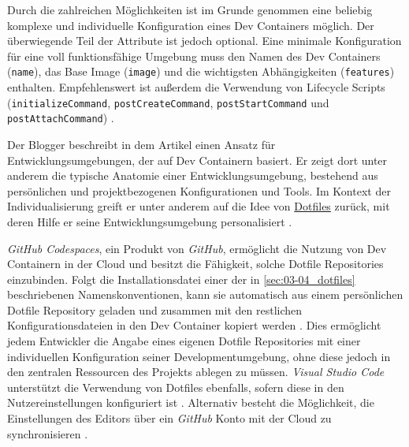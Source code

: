 Durch die zahlreichen Möglichkeiten ist im Grunde genommen eine beliebig komplexe und individuelle Konfiguration eines Dev Containers möglich. Der überwiegende Teil der Attribute ist jedoch optional. Eine minimale Konfiguration für eine voll funktionsfähige Umgebung muss den Namen des Dev Containers (\texttt{name}), das Base Image (\texttt{image}) und die wichtigsten Abhängigkeiten (\texttt{features}) enthalten. Empfehlenswert ist außerdem die Verwendung von Lifecycle Scripts (\texttt{initializeCommand}, \texttt{postCreateCommand}, \texttt{postStartCommand} und \texttt{postAttachCommand}) \cite{204:Development-Containers-Simplified}.

Der Blogger \citeauthor{203:Dev-Environment-as-a-Code-with-DevContainers-Dotfiles-and-GitHub-Codespaces} beschreibt in dem Artikel  einen Ansatz für Entwicklungsumgebungen, der auf Dev Containern basiert. Er zeigt dort unter anderem die typische Anatomie einer Entwicklungsumgebung, bestehend aus persönlichen und projektbezogenen Konfigurationen und Tools. Im Kontext der Individualisierung greift er unter anderem auf die Idee von \hyperref[sec:03-04_dotfiles]{Dotfiles} zurück, mit deren Hilfe er seine Entwicklungsumgebung personalisiert \cite{203:Dev-Environment-as-a-Code-with-DevContainers-Dotfiles-and-GitHub-Codespaces}.

\textit{GitHub Codespaces}, ein Produkt von \textit{GitHub}, ermöglicht die Nutzung von Dev Containern in der Cloud und besitzt die Fähigkeit, solche Dotfile Repositories einzubinden. Folgt die Installationsdatei einer der in \autoref{sec:03-04_dotfiles} beschriebenen Namenskonventionen, kann sie automatisch aus einem persönlichen Dotfile Repository geladen und zusammen mit den restlichen Konfigurationsdateien in den Dev Container kopiert werden \cite{304:Personalizing-GitHub-Codespaces-for-your-Account}. Dies ermöglicht jedem Entwickler die Angabe eines eigenen Dotfile Repositories mit einer individuellen Konfiguration seiner Developmentumgebung, ohne diese jedoch in den zentralen Ressourcen des Projekts ablegen zu müssen. \textit{Visual Studio Code} unterstützt die Verwendung von Dotfiles ebenfalls, sofern diese in den Nutzereinstellungen konfiguriert ist \cite{201:How-to-develop-with-Dev-Containers}. Alternativ besteht die Möglichkeit, die Einstellungen des Editors über ein \textit{GitHub} Konto mit der Cloud zu synchronisieren \cite{304:Personalizing-GitHub-Codespaces-for-your-Account}.
